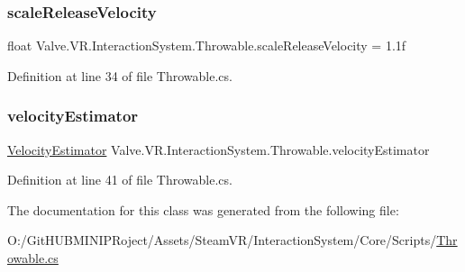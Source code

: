 \subsubsection{\texorpdfstring{scaleReleaseVelocity}{scaleReleaseVelocity}}
{\footnotesize\ttfamily float Valve.\+V\+R.\+Interaction\+System.\+Throwable.\+scale\+Release\+Velocity = 1.\+1f}



Definition at line 34 of file Throwable.\+cs.

\mbox{\label{class_valve_1_1_v_r_1_1_interaction_system_1_1_throwable_a19421d37faa186b5c0271a73e2976484}} 
\subsubsection{\texorpdfstring{velocityEstimator}{velocityEstimator}}
{\footnotesize\ttfamily \mbox{\hyperlink{class_valve_1_1_v_r_1_1_interaction_system_1_1_velocity_estimator}{Velocity\+Estimator}} Valve.\+V\+R.\+Interaction\+System.\+Throwable.\+velocity\+Estimator\hspace{0.3cm}{\ttfamily [protected]}}



Definition at line 41 of file Throwable.\+cs.



The documentation for this class was generated from the following file\+:\begin{DoxyCompactItemize}
\item 
O\+:/\+Git\+H\+U\+B\+M\+I\+N\+I\+P\+Roject/\+Assets/\+Steam\+V\+R/\+Interaction\+System/\+Core/\+Scripts/\mbox{\hyperlink{_throwable_8cs}{Throwable.\+cs}}\end{DoxyCompactItemize}

